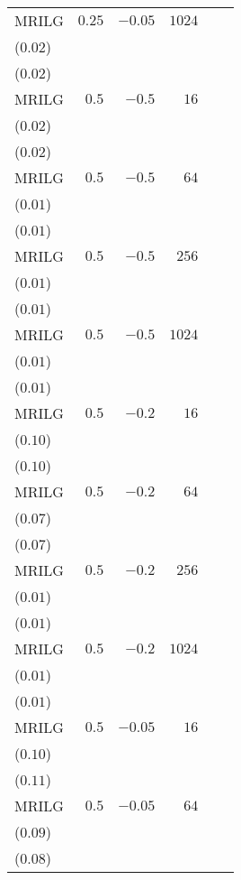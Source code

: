 \begin{table}[t]
\begin{tabular}{lrrrrr}
MRILG & \(0.25\) & \(-0.05\) & \(1024\) & \longcell{\(0.19\)\\{\tiny(\(0.02\))}} & \longcell{\(0.19\)\\{\tiny(\(0.02\))}} \\[2.2ex]
MRILG & \(0.5\) & \(-0.5\) & \(16\) & \longcell{\(0.24\)\\{\tiny(\(0.02\))}} & \longcell{\(0.24\)\\{\tiny(\(0.02\))}} \\[2.2ex]
MRILG & \(0.5\) & \(-0.5\) & \(64\) & \longcell{\(0.23\)\\{\tiny(\(0.01\))}} & \longcell{\(0.23\)\\{\tiny(\(0.01\))}} \\[2.2ex]
MRILG & \(0.5\) & \(-0.5\) & \(256\) & \longcell{\(0.21\)\\{\tiny(\(0.01\))}} & \longcell{\(0.21\)\\{\tiny(\(0.01\))}} \\[2.2ex]
MRILG & \(0.5\) & \(-0.5\) & \(1024\) & \longcell{\(0.19\)\\{\tiny(\(0.01\))}} & \longcell{\(0.19\)\\{\tiny(\(0.01\))}} \\[2.2ex]
MRILG & \(0.5\) & \(-0.2\) & \(16\) & \longcell{\(0.18\)\\{\tiny(\(0.10\))}} & \longcell{\(0.18\)\\{\tiny(\(0.10\))}} \\[2.2ex]
MRILG & \(0.5\) & \(-0.2\) & \(64\) & \longcell{\(0.21\)\\{\tiny(\(0.07\))}} & \longcell{\(0.21\)\\{\tiny(\(0.07\))}} \\[2.2ex]
MRILG & \(0.5\) & \(-0.2\) & \(256\) & \longcell{\(0.21\)\\{\tiny(\(0.01\))}} & \longcell{\(0.21\)\\{\tiny(\(0.01\))}} \\[2.2ex]
MRILG & \(0.5\) & \(-0.2\) & \(1024\) & \longcell{\(0.19\)\\{\tiny(\(0.01\))}} & \longcell{\(0.19\)\\{\tiny(\(0.01\))}} \\[2.2ex]
MRILG & \(0.5\) & \(-0.05\) & \(16\) & \longcell{\(0.17\)\\{\tiny(\(0.10\))}} & \longcell{\(0.17\)\\{\tiny(\(0.11\))}} \\[2.2ex]
MRILG & \(0.5\) & \(-0.05\) & \(64\) & \longcell{\(0.19\)\\{\tiny(\(0.09\))}} & \longcell{\(0.19\)\\{\tiny(\(0.08\))}} \\[2.2ex]

\end{tabular}
\end{table}
